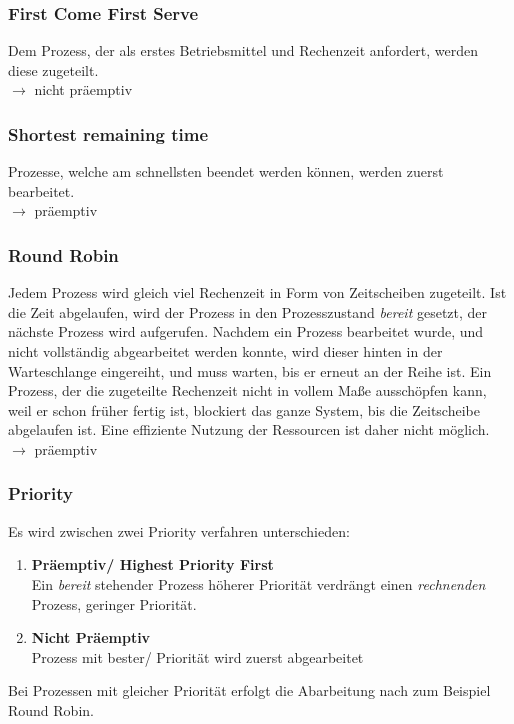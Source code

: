 \documentclass[12pt,a4paper]{article}
\begin{document}
		\subsubsection{First Come First Serve}
			Dem Prozess, der als erstes Betriebsmittel und Rechenzeit anfordert, werden diese zugeteilt. \\
			$\longrightarrow$ nicht präemptiv
		
		\subsubsection{Shortest remaining time}
			Prozesse, welche am schnellsten beendet werden können, werden zuerst bearbeitet.\\
			$\longrightarrow$ präemptiv
		
		\subsubsection{Round Robin}
			Jedem Prozess wird gleich viel Rechenzeit in Form von Zeitscheiben zugeteilt. 
			Ist die Zeit abgelaufen, wird der Prozess in den Prozesszustand \textit{bereit} gesetzt, der nächste Prozess wird aufgerufen. 
			Nachdem ein Prozess bearbeitet wurde, und nicht vollständig abgearbeitet werden konnte, wird dieser hinten in der Warteschlange eingereiht, und muss warten, bis er erneut an der Reihe ist. Ein Prozess, der die zugeteilte Rechenzeit nicht in vollem Maße ausschöpfen kann, weil er schon früher fertig ist, blockiert das ganze System, bis die Zeitscheibe abgelaufen ist. Eine effiziente Nutzung der Ressourcen ist daher nicht möglich.\\
			$\longrightarrow$ präemptiv
			
		\subsubsection{Priority}
			Es wird zwischen zwei Priority verfahren unterschieden:
			\begin{enumerate}
				\item \textbf{Präemptiv/ Highest Priority First}\\
						Ein \textit{bereit} stehender Prozess höherer Priorität verdrängt einen \textit{rechnenden} Prozess, geringer Priorität.
				\item \textbf{Nicht Präemptiv}\\
						Prozess mit bester/ Priorität wird zuerst abgearbeitet
			\end{enumerate}
			Bei Prozessen mit gleicher Priorität erfolgt die Abarbeitung nach zum Beispiel Round Robin.\newline\newline
	
\end{document}
